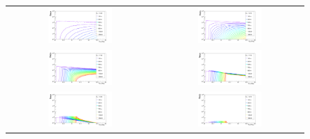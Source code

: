 	\begin{figure}[ht!]
		\centering
		\begin{tabular}{cc}
		\includegraphics[width=0.45\textwidth]{fig/resultadosRadio/weights16_25} &
		\includegraphics[width=0.45\textwidth]{fig/resultadosRadio/weights16_75} \\
		\includegraphics[width=0.45\textwidth]{fig/resultadosRadio/weights17_25} &
		\includegraphics[width=0.45\textwidth]{fig/resultadosRadio/weights17_75} \\
		\includegraphics[width=0.45\textwidth]{fig/resultadosRadio/weights18_25} &
		\includegraphics[width=0.45\textwidth]{fig/resultadosRadio/weights18_75} \\
		\end{tabular}


\end{figure}
